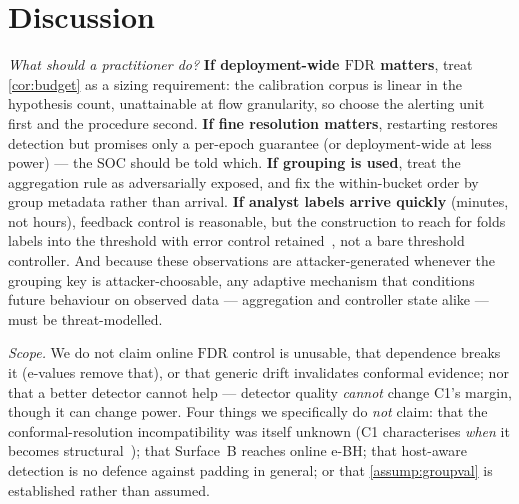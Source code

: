 \documentclass[conference]{IEEEtran}
\newcommand{\FDR}{\mathrm{FDR}}
\begin{document}
\section{Discussion}\label{sec:discussion}

\emph{What should a practitioner do?} \textbf{If deployment-wide $\FDR$ matters}, treat
\cref{cor:budget} as a sizing requirement: the calibration corpus is linear in the hypothesis count,
unattainable at flow granularity, so choose the alerting unit first and the procedure second.
\textbf{If fine resolution matters}, restarting restores detection but promises only a per-epoch
guarantee (or deployment-wide at less power) --- the SOC should be told which. \textbf{If grouping is
used}, treat the aggregation rule as adversarially exposed, and fix the within-bucket order by group
metadata rather than arrival. \textbf{If analyst labels arrive quickly} (minutes, not hours), feedback control is reasonable, but the
construction to reach for folds labels into the threshold with error control
retained~\cite{lu2026gaif}, not a bare threshold controller. And because these observations are
attacker-generated whenever the grouping key is attacker-choosable, any adaptive mechanism that
conditions future behaviour on observed data --- aggregation and controller state alike --- must be
threat-modelled.

\emph{Scope.}\label{sec:nonclaims} We do not claim online $\FDR$ control is unusable, that dependence
breaks it (e-values remove that), or that generic drift invalidates conformal evidence; nor that a
better detector cannot help --- detector quality \emph{cannot} change C1's margin, though it can change
power. Four things we specifically do \emph{not} claim: that the conformal-resolution incompatibility
was itself unknown (C1 characterises \emph{when} it becomes structural~\cite{huo2024realtime}); that
Surface~B reaches online e-BH; that host-aware detection is no defence against padding in general; or
that \cref{assump:groupval} is established rather than assumed.
\end{document}
